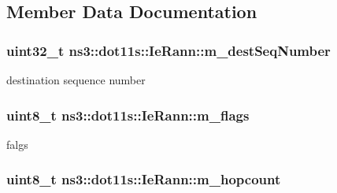 \subsection{Member Data Documentation}
\subsubsection[{\texorpdfstring{m\+\_\+dest\+Seq\+Number}{m_destSeqNumber}}]{\setlength{\rightskip}{0pt plus 5cm}uint32\+\_\+t ns3\+::dot11s\+::\+Ie\+Rann\+::m\+\_\+dest\+Seq\+Number\hspace{0.3cm}{\ttfamily [private]}}\hypertarget{classns3_1_1dot11s_1_1IeRann_a870e4e65b2afa14829199d2da495bde0}{}\label{classns3_1_1dot11s_1_1IeRann_a870e4e65b2afa14829199d2da495bde0}


destination sequence number 

\subsubsection[{\texorpdfstring{m\+\_\+flags}{m_flags}}]{\setlength{\rightskip}{0pt plus 5cm}uint8\+\_\+t ns3\+::dot11s\+::\+Ie\+Rann\+::m\+\_\+flags\hspace{0.3cm}{\ttfamily [private]}}\hypertarget{classns3_1_1dot11s_1_1IeRann_a0f1db2fd566595a981525e11806dba6b}{}\label{classns3_1_1dot11s_1_1IeRann_a0f1db2fd566595a981525e11806dba6b}


falgs 

\subsubsection[{\texorpdfstring{m\+\_\+hopcount}{m_hopcount}}]{\setlength{\rightskip}{0pt plus 5cm}uint8\+\_\+t ns3\+::dot11s\+::\+Ie\+Rann\+::m\+\_\+hopcount\hspace{0.3cm}{\ttfamily [private]}}\hypertarget{classns3_1_1dot11s_1_1IeRann_a7d1628c661d49afd647ec10b768a6e7e}{}\label{classns3_1_1dot11s_1_1IeRann_a7d1628c661d49afd647ec10b768a6e7e}


